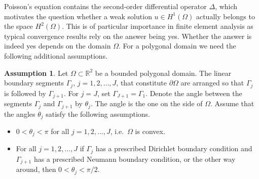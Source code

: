 \documentclass[english, 12pt, a4paper, sci, utf8, a-2b, online]{aaltothesis}
\theoremstyle{definition}
\newtheorem{assumption}{Assumption}[section]
\theoremstyle{plain}
\numberwithin{equation}{section}
\begin{document}
Poisson's equation contains the second-order differential operator $\Delta$,
which motivates the question whether a weak solution $u \in H^1(\Omega)$
actually belongs to the space $H^2(\Omega)$.
This is of particular importance in finite element analysis as typical convergence
results rely on the answer being yes. Whether the answer is indeed yes
depends on the domain $\Omega$. For a polygonal domain we need the following
additional assumptions.
\begin{assumption}
    \label{ass:regular_polygonal_domain}
    Let $\Omega \subset \mathbb{R}^2$ be a bounded polygonal domain.
    The linear boundary segments $\Gamma_j$, $j = 1,2,\dotsc,J$,
    that constitute $\partial \Omega$ are arranged so that
    $\Gamma_j$ is followed by $\Gamma_{j+1}$.
    For $j=J$, set $\Gamma_{J+1} = \Gamma_1$.
    Denote the angle between the segments $\Gamma_j$ and $\Gamma_{j+1}$
    by $\theta_j$. The angle is the one on the side of $\Omega$.
    Assume that the angles $\theta_j$ satisfy the following assumptions.
    \begin{itemize}[(i)]
        \item $0 < \theta_j < \pi$ for all $j=1,2,\dotsc,J$,
        i.e.\ $\Omega$ is convex.
        \item For all $j=1,2,\dotsc,J$ if $\Gamma_j$ has a prescribed
        Dirichlet boundary condition and $\Gamma_{j+1}$ has a prescribed
        Neumann boundary condition, or the other way around, then
        $0 < \theta_j < \pi / 2$.
    \end{itemize}
\end{assumption}
\end{document}

